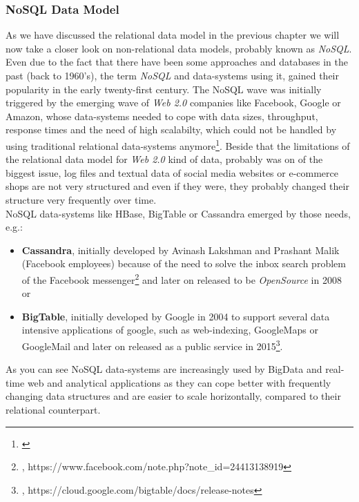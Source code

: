 {\subsubsection{NoSQL Data Model}
\label{tf_dma_datamodels_dodm}

As we have discussed the relational data model in the previous chapter we will now take a closer look on non-relational data models, probably known as \textit{NoSQL}. \\
Even due to the fact that there have been some approaches and databases in the past (back to 1960's), the term \textit{NoSQL} and data-systems using it, gained their popularity in the early twenty-first century. The NoSQL wave was initially triggered by the emerging wave of \textit{Web 2.0} companies like Facebook, Google or Amazon, whose data-systems needed to cope with data sizes, throughput, response times and the need of high scalabilty, which could not be handled by using traditional relational data-systems anymore\footnote{\cite{IBMNS}}. Beside that the limitations of the relational data model for \textit{Web 2.0} kind of data, probably was on of the biggest issue, log files and textual data of social media websites or e-commerce shops are not very structured and even if they were, they probably changed their structure very frequently over time. \\
NoSQL data-systems like HBase, BigTable or Cassandra emerged by those needs, e.g.:
\begin{samepage}
\begin{itemize}
\item \textbf{Cassandra}, initially developed by Avinash Lakshman and Prashant Malik (Facebook employees) because of the need to solve the inbox search problem of the Facebook messenger\footnote{\cite{FBISP}, https://www.facebook.com/note.php?note\_id=24413138919} and later on released to be \textit{OpenSource} in 2008 or 
\item \textbf{BigTable}, initially developed by Google in 2004 to support several data intensive applications of google, such as web-indexing, GoogleMaps or GoogleMail and later on released as a public service in 2015\footnote{\cite{BTREL}, https://cloud.google.com/bigtable/docs/release-notes}.\\
\end{itemize}
\end{samepage}

As you can see NoSQL data-systems are increasingly used by BigData and real-time web and analytical applications as they can cope better with frequently changing data structures and are easier to scale horizontally, compared to their relational counterpart.\\

}
